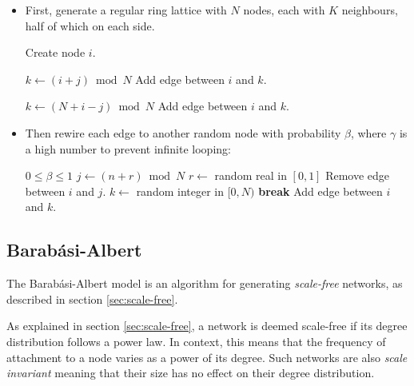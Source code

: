 \documentclass[a4paper,11pt,titlepage]{article}
\begin{document}
\begin{itemize}
  \item First, generate a regular ring lattice with $N$ nodes,
        each with $K$ neighbours, half of which on each side.

  \begin{algorithmic}
      \STATE Create node $i$.
    \ENDFOR

        \STATE $k \gets (i + j) \bmod{N}$
        \STATE Add edge between $i$ and $k$.
      \ENDFOR

        \STATE $k \gets (N + i - j) \bmod{N}$
        \STATE Add edge between $i$ and $k$.
      \ENDFOR
    \ENDFOR
  \end{algorithmic}

  \item Then rewire each edge to another random node with
        probability $\beta$, where $\gamma$ is a high number
        to prevent infinite looping:

  \begin{algorithmic}
    \REQUIRE $0 \leq \beta \leq 1$
        \STATE $j \gets (n + r) \bmod{N}$
        \STATE $r \gets$ random real in $[0, 1]$
          \STATE Remove edge between $i$ and $j$.
            \STATE $k \gets$ random integer in $[0, N)$
              \STATE \textbf{break}
            \ELSE
              \STATE Add edge between $i$ and $k$.
            \ENDIF
          \ENDFOR
        \ENDIF
      \ENDFOR
    \ENDFOR
  \end{algorithmic}
\end{itemize}

\subsection{Barab\'{a}si-Albert}

The Barab\'{a}si-Albert model is an algorithm for generating \emph{scale-free}
networks, as described in section \ref{sec:scale-free}.

As explained in section \ref{sec:scale-free}, a network is deemed scale-free if
its degree distribution follows a power law. In context, this means that the
frequency of attachment to a node varies as a power of its degree. Such networks
are also \emph{scale invariant} meaning that their size has no effect on their
degree distribution.
\end{document}
